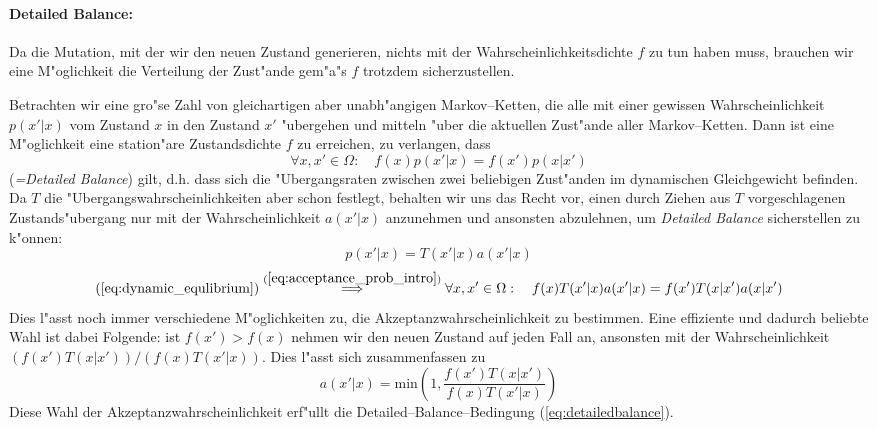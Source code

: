 		
	\paragraph{Detailed Balance:}
	Da die Mutation, mit der wir den neuen Zustand generieren, nichts mit der Wahrscheinlichkeitsdichte $f$ zu tun haben muss, brauchen wir eine M"oglichkeit die Verteilung der Zust"ande gem"a"s $f$ trotzdem sicherzustellen.
	
	Betrachten wir eine gro"se Zahl von gleichartigen aber unabh"angigen Markov--Ketten, die alle mit einer gewissen Wahrscheinlichkeit $p(x'|x)$ vom Zustand $x$ in den Zustand $x'$ "ubergehen und mitteln "uber die aktuellen Zust"ande aller Markov--Ketten. Dann ist eine M"oglichkeit eine station"are Zustandsdichte $f$ zu erreichen, zu verlangen, dass
	\begin{equation}
		\forall x,x' \in \Omega :\quad f(x)p(x'|x) = f(x')p(x|x')
		\label{eq:dynamic_equlibrium}
	\end{equation}
	({\em =Detailed Balance}) gilt, d.h. dass sich die "Ubergangsraten zwischen zwei beliebigen Zust"anden im dynamischen Gleichgewicht befinden.
	Da $T$ die "Ubergangswahrscheinlichkeiten aber schon festlegt, behalten wir uns das Recht vor, einen durch Ziehen aus $T$ vorgeschlagenen Zustands"ubergang nur mit der Wahrscheinlichkeit $a(x'|x)$ anzunehmen und ansonsten abzulehnen,	um {\em Detailed Balance} sicherstellen zu k"onnen:
	\begin{equation}
		p(x'|x) = T(x'|x)a(x'|x)
		\label{eq:acceptance_prob_intro}
	\end{equation}
	\begin{equation}
		(\ref{eq:dynamic_equlibrium}) \stackrel{(\ref{eq:acceptance_prob_intro})}{\Longrightarrow}
		\forall x,x' \in \Omega :\quad f(x)T(x'|x)a(x'|x) = f(x')T(x|x')a(x|x')
		\label{eq:detailedbalance}
	\end{equation}
	Dies l"asst noch immer verschiedene M"oglichkeiten zu, die Akzeptanzwahrscheinlichkeit zu bestimmen. Eine effiziente und dadurch beliebte Wahl ist dabei Folgende: ist $f(x')>f(x)$ nehmen wir den neuen Zustand auf jeden Fall an, ansonsten mit der Wahrscheinlichkeit $(f(x')T(x|x'))/(f(x)T(x'|x))$. Dies l"asst sich zusammenfassen zu
	\begin{equation}
		a(x'|x)=\text{min}\left(1,\frac{f(x')T(x|x')}{f(x)T(x'|x)}\right)
		\label{eq:acceptanceratio}
	\end{equation}
	Diese Wahl der Akzeptanzwahrscheinlichkeit erf"ullt die Detailed--Balance--Bedingung (\ref{eq:detailedbalance}).
	
